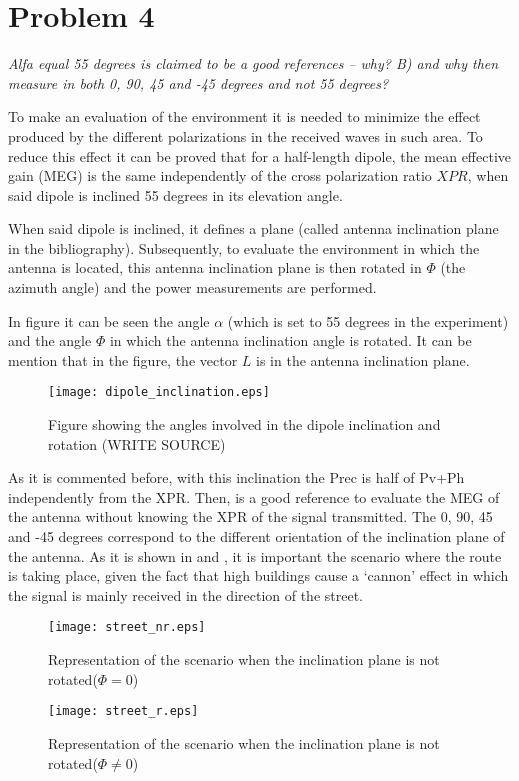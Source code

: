\section{Problem 4}
\textit{Alfa equal 55 degrees is claimed to be a good references – why? B) and why then measure in both 0, 90, 45 and -45 degrees and not 55 degrees?}

To make an evaluation of the environment it is needed to minimize the effect produced by the different polarizations in the received waves in such area. To reduce this effect it can be proved that for a half-length dipole, the mean effective gain (MEG) is the same independently of the cross polarization ratio $XPR$, when said dipole is inclined 55 degrees in its elevation angle.

When said dipole is inclined, it defines a plane (called antenna inclination plane in the bibliography). Subsequently, to evaluate the environment in which the antenna is located, this antenna inclination plane is then rotated in $\Phi$ (the azimuth angle) and the power measurements are performed.

In figure  it can be seen the angle $\alpha$ (which is set to 55 degrees in the experiment) and the angle $\Phi$ in which the antenna inclination angle is rotated. It can be mention that in the figure, the vector $L$ is in the antenna inclination plane.


\begin{figure}[!h]
  \centering
  \texttt{[image: dipole\_inclination.eps]}
  \caption{Figure showing the angles involved in the dipole inclination and rotation (WRITE SOURCE)}
  \label{fig:dipole_inclination}
\end{figure}

As it is commented before, with this inclination the Prec is half of Pv+Ph independently from the XPR. Then, is a good reference to evaluate the MEG of the antenna without knowing the XPR of the signal transmitted.
The 0, 90, 45 and -45 degrees correspond to the different orientation of the inclination plane of the antenna. As it is shown in  and , it is important the scenario where the route is taking place, given the fact that high buildings cause a ‘cannon’ effect in which the signal is mainly received in the direction of the street.

\begin{figure}[!h]
  \centering
  \texttt{[image: street\_nr.eps]}
  \caption{Representation of the scenario when the inclination plane is not rotated($\Phi=0$)}
  \label{fig:street_nr}
\end{figure}

\begin{figure}[!h]
  \centering
  \texttt{[image: street\_r.eps]}
  \caption{Representation of the scenario when the inclination plane is not rotated($\Phi\neq0$)}
  \label{fig:street_r}
\end{figure}
